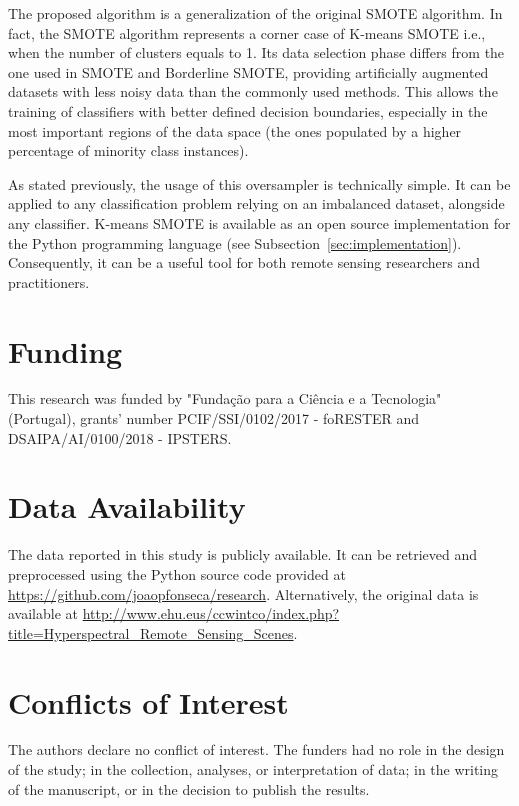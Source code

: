 \documentclass[authoryear,preprint,12pt]{elsarticle}
\begin{document}
\begin{linenumbers}
The proposed algorithm is a generalization of the original SMOTE algorithm. In
fact, the SMOTE algorithm represents a corner case of K-means SMOTE i.e., when
the number of clusters equals to 1. Its data selection phase differs from the
one used in SMOTE and Borderline SMOTE, providing artificially augmented
datasets with less noisy data than the commonly used methods. This allows the
training of classifiers with better defined decision boundaries, especially in
the most important regions of the data space (the ones populated by a higher
percentage of minority class instances).

As stated previously, the usage of this oversampler is technically simple. It
can be applied to any classification problem relying on an imbalanced dataset,
alongside any classifier. K-means SMOTE is available as an open source
implementation for the Python programming language (see
Subsection~\ref{sec:implementation}).  Consequently, it can be a useful tool
for both remote sensing researchers and practitioners.

\section{Funding}

This research was funded by "Fundação para a Ciência e a Tecnologia"
(Portugal), grants' number PCIF/SSI/0102/2017 - foRESTER and
DSAIPA/AI/0100/2018 - IPSTERS.

\section{Data Availability}

The data reported in this study is publicly available. It can be retrieved and
preprocessed using the Python source code provided at
\url{https://github.com/joaopfonseca/research}. Alternatively, the original
data is available at
\url{http://www.ehu.eus/ccwintco/index.php?title=Hyperspectral_Remote_Sensing_Scenes}.


\section{Conflicts of Interest}

The authors declare no conflict of interest. The funders had no role in the
design of the study; in the collection, analyses, or interpretation of data;
in the writing of the manuscript, or in the decision to publish the results.

\end{linenumbers}



\end{document}

